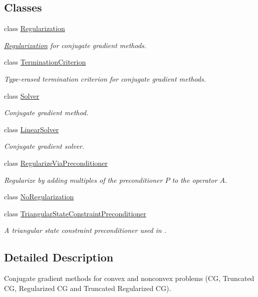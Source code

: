 \subsection*{Classes}
\begin{DoxyCompactItemize}
\item 
class \hyperlink{classSpacy_1_1CG_1_1Regularization}{Regularization}
\begin{DoxyCompactList}\small\item\em \hyperlink{classSpacy_1_1CG_1_1Regularization}{Regularization} for conjugate gradient methods. \end{DoxyCompactList}\item 
class \hyperlink{classSpacy_1_1CG_1_1TerminationCriterion}{Termination\-Criterion}
\begin{DoxyCompactList}\small\item\em Type-\/erased termination criterion for conjugate gradient methods. \end{DoxyCompactList}\item 
class \hyperlink{classSpacy_1_1CG_1_1Solver}{Solver}
\begin{DoxyCompactList}\small\item\em Conjugate gradient method. \end{DoxyCompactList}\item 
class \hyperlink{classSpacy_1_1CG_1_1LinearSolver}{Linear\-Solver}
\begin{DoxyCompactList}\small\item\em Conjugate gradient solver. \end{DoxyCompactList}\item 
class \hyperlink{classSpacy_1_1CG_1_1RegularizeViaPreconditioner}{Regularize\-Via\-Preconditioner}
\begin{DoxyCompactList}\small\item\em Regularize by adding multiples of the preconditioner $P$ to the operator $A$. \end{DoxyCompactList}\item 
class \hyperlink{classSpacy_1_1CG_1_1NoRegularization}{No\-Regularization}
\item 
class \hyperlink{classSpacy_1_1CG_1_1TriangularStateConstraintPreconditioner}{Triangular\-State\-Constraint\-Preconditioner}
\begin{DoxyCompactList}\small\item\em A triangular state constraint preconditioner used in \cite{Lubkoll2015a}. \end{DoxyCompactList}\end{DoxyCompactItemize}


\subsection{Detailed Description}
Conjugate gradient methods for convex and nonconvex problems (C\-G, Truncated C\-G, Regularized C\-G and Truncated Regularized C\-G). 